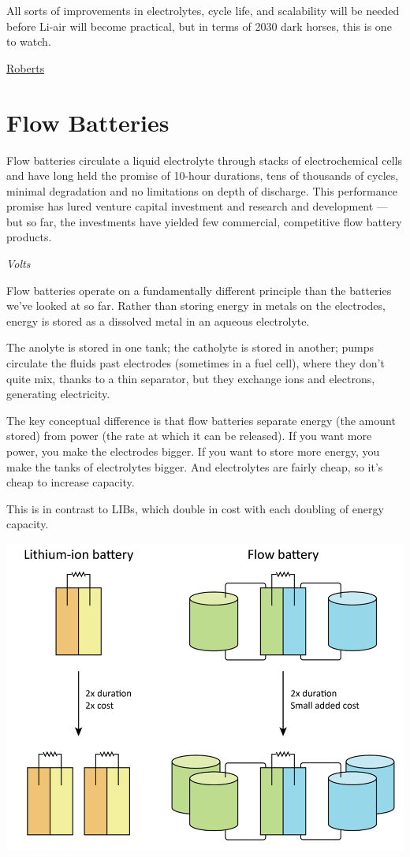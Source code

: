 \documentclass[
]{book}
\begin{document}
All sorts of improvements in electrolytes, cycle life, and scalability will be needed before Li-air will become practical, but in terms of 2030 dark horses, this is one to watch.

\href{https://www.volts.wtf/p/the-ongoing-battle-among-lithium}{Roberts}

\hypertarget{flow-batteries}{%
\section{Flow Batteries}\label{flow-batteries}}

Flow batteries circulate a liquid electrolyte through stacks of electrochemical cells and have long held the promise of 10-hour durations, tens of thousands of cycles, minimal degradation and no limitations on depth of discharge. This performance promise has lured venture capital investment and research and development --- but so far, the investments have yielded few commercial, competitive flow battery products.

\emph{Volts}

Flow batteries operate on a fundamentally different principle than the batteries we've looked at so far. Rather than storing energy in metals on the electrodes, energy is stored as a dissolved metal in an aqueous electrolyte.

The anolyte is stored in one tank; the catholyte is stored in another; pumps circulate the fluids past electrodes (sometimes in a fuel cell), where they don't quite mix, thanks to a thin separator, but they exchange ions and electrons, generating electricity.

The key conceptual difference is that flow batteries separate energy (the amount stored) from power (the rate at which it can be released). If you want more power, you make the electrodes bigger. If you want to store more energy, you make the tanks of electrolytes bigger. And electrolytes are fairly cheap, so it's cheap to increase capacity.

This is in contrast to LIBs, which double in cost with each doubling of energy capacity.

\includegraphics{fig/flow_battery.png}
\end{document}
